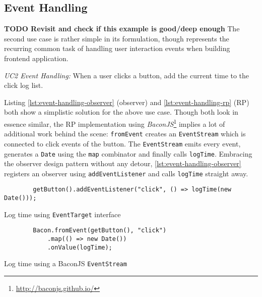 \documentclass[12pt,a4paper]{article}
\begin{document}
\subsection{Event Handling}

\textbf{TODO Revisit and check if this example is good/deep enough} The second use case is rather simple in its formulation, though represents the recurring common task of handling user interaction events when building frontend application.

\begin{framed}
	\noindent\emph{UC2 Event Handling:} When a user clicks a button, add the current time to the click log list.
\end{framed}

Listing \ref{lst:event-handling-observer} (observer) and \ref{lst:event-handling-rp} (RP) both show a simplistic solution for the above use case. Though both look in essence similar, the RP implementation using \emph{BaconJS}\footnote{\url{http://baconjs.github.io/}} implies a lot of additional work behind the scene: \texttt{fromEvent} creates an \texttt{EventStream} which is connected to click events of the button. The \texttt{EventStream} emits every event, generates a \texttt{Date} using the \texttt{map} combinator and finally calls \texttt{logTime}. Embracing the observer design pattern without any detour, \ref{lst:event-handling-observer} registers an observer using \texttt{addEventListener} and calls \texttt{logTime} straight away.

\begin{listing}[H]
	\begin{verbatim}
		getButton().addEventListener("click", () => logTime(new Date()));
	\end{verbatim}
	\caption{Log time using \texttt{EventTarget} interface}
	\label{lst:event-handling-observer}
\end{listing}

\begin{listing}[H]
	\begin{verbatim}
		Bacon.fromEvent(getButton(), "click")
			.map(() => new Date())
			.onValue(logTime);
	\end{verbatim}
	\caption{Log time using a BaconJS \texttt{EventStream}}
	\label{lst:event-handling-rp}
\end{listing}
\end{document}
